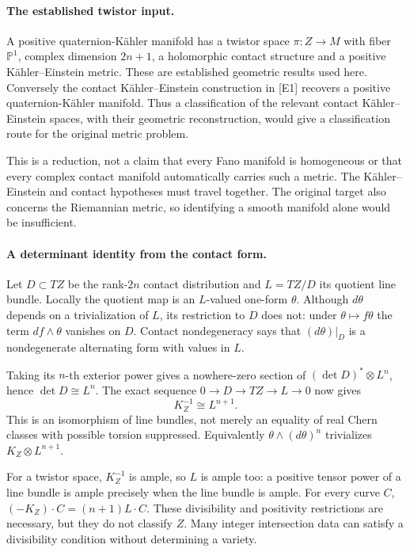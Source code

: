 \documentclass[11pt]{article}
\begin{document}
\paragraph{The established twistor input.}
A positive quaternion-K\"ahler manifold has a twistor space
$\pi:Z\to M$ with fiber $\mathbb P^1$, complex dimension $2n+1$,
a holomorphic contact structure and a positive K\"ahler--Einstein
metric. These are established geometric results used here.
Conversely the contact K\"ahler--Einstein construction in [E1]
recovers a positive quaternion-K\"ahler manifold. Thus a
classification of the relevant contact K\"ahler--Einstein
spaces, with their geometric reconstruction, would give a
classification route for the original metric problem.

This is a reduction, not a claim that every Fano manifold
is homogeneous or that every complex contact manifold
automatically carries such a metric. The K\"ahler--Einstein
and contact hypotheses must travel together. The original
target also concerns the Riemannian metric, so identifying
a smooth manifold alone would be insufficient.

\paragraph{A determinant identity from the contact form.}
Let $D\subset TZ$ be the rank-$2n$ contact distribution and
$L=TZ/D$ its quotient line bundle. Locally the quotient
map is an $L$-valued one-form $\theta$. Although $d\theta$
depends on a trivialization of $L$, its restriction to
$D$ does not: under $\theta\mapsto f\theta$ the term
$df\wedge\theta$ vanishes on $D$. Contact nondegeneracy
says that $(d\theta)|_D$ is a nondegenerate alternating
form with values in $L$.

Taking its $n$-th exterior power gives a nowhere-zero
section of $(\det D)^*\otimes L^n$, hence
$\det D\cong L^n$. The exact sequence
$0\to D\to TZ\to L\to0$ now gives
\begin{equation}\label{a442:canonical}
                     K_Z^{-1}\cong L^{n+1}.
\end{equation}
This is an isomorphism of line bundles, not merely
an equality of real Chern classes with possible
torsion suppressed. Equivalently
$\theta\wedge(d\theta)^n$ trivializes
$K_Z\otimes L^{n+1}$.

For a twistor space, $K_Z^{-1}$ is ample, so $L$ is
ample too: a positive tensor power of a line bundle
is ample precisely when the line bundle is ample.
For every curve $C$,
$(-K_Z)\cdot C=(n+1)L\cdot C$.
These divisibility and positivity restrictions are
necessary, but they do not classify $Z$. Many
integer intersection data can satisfy a divisibility
condition without determining a variety.
\end{document}

